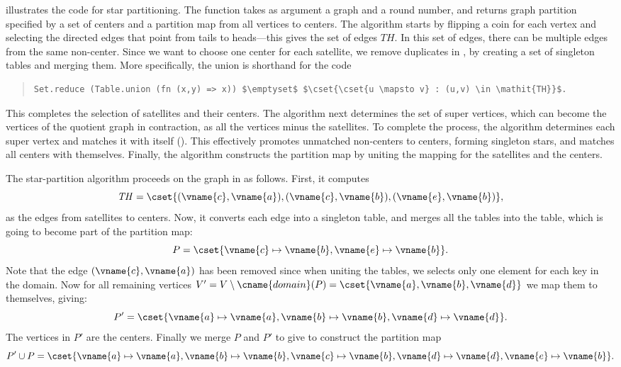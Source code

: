 { illustrates the code for star
partitioning.  
%
The function  takes as argument a graph and a round
number, and returns graph partition specified by a set of centers and
a partition map from all vertices to centers.
%
The algorithm starts by flipping a coin for each vertex and selecting the directed
edges that point from tails to heads---this gives
the set of edges $\mathit{TH}$.
%
In this set of edges, there can be multiple edges from the same
non-center. Since we want to choose one center for each satellite, we
remove duplicates in , by creating a set of
singleton tables and merging them. 
%
More specifically, the union is shorthand for the code
\begin{quote}
\begin{lstlisting}[numbers=none]
Set.reduce (Table.union (fn (x,y) => x)) $\emptyset$ $\cset{\cset{u \mapsto v} : (u,v) \in \mathit{TH}}$.
\end{lstlisting}
\end{quote}
%
This completes the selection of satellites and their centers. 
%
The algorithm next determines the set of super vertices, which
can become the vertices of the quotient graph in contraction, as all
the vertices minus the satellites.
%
To complete the process, the algorithm determines each super vertex 
and matches it with itself ().
%
This effectively promotes unmatched non-centers to centers, forming
singleton stars, and matches all centers with themselves.  
%
Finally, the algorithm constructs the partition map by  uniting the
mapping for the satellites and the centers.

\begin{example}
The  star-partition algorithm proceeds on the graph in
 as follows.
%
First, it computes
%
\[
\mathit{TH} =
\cset{(\vname{c},\vname{a}),(\vname{c},\vname{b}),(\vname{e},\vname{b})},
\]
%
as the edges from satellites to centers.  
%
Now, it
converts each edge into a singleton table, and merges all the tables into the
table, which is going to become part of the partition map:
%
\[
P = \cset{\vname{c} \mapsto \vname{b},\vname{e} \mapsto \vname{b}}.
\]
%
Note that the edge $(\vname{c},\vname{a})$ has been removed since when
uniting the tables, we selects only one element for each key in the
domain.  
%
Now for all remaining vertices
%
$V' = V \setminus \cname{domain}(P) = \cset{\vname{a},\vname{b},\vname{d}}$
we map them to themselves, giving:
%
\[
P' = \cset{\vname{a} \mapsto \vname{a}, \vname{b} \mapsto \vname{b},
  \vname{d} \mapsto \vname{d}}.
\]
%
The vertices in $P'$ are the centers.
%
Finally we merge $P$ and $P'$ to give to construct the partition map
%
\[
P' \cup P = \cset{\vname{a} \mapsto \vname{a}, \vname{b} \mapsto \vname{b}, \vname{c} \mapsto \vname{b}, \vname{d} \mapsto
    \vname{d}, \vname{e} \mapsto \vname{b}}.
\]
\end{example}

}
